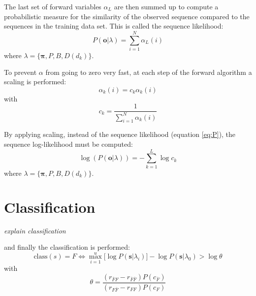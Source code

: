 \documentclass[mscthesis]{usiinfthesis}
\begin{document}
The last set of forward variables $ \alpha_L $ are then summed up to compute
a probabilistic measure for the similarity of the observed sequence compared to
the sequences in the training data set. This is called the sequence likelihood:
\begin{equation}
    \label{eq:P}
    P(\boldsymbol{o}|\lambda) = \sum\limits_{i=1}^{N} \alpha_L(i)
\end{equation}
where $ \lambda = \{\boldsymbol{\pi}, P, B, D(d_k) \} $.

To prevent $ \alpha $ from going to zero very fast, at each step of the forward
algorithm a scaling is performed:
\begin{equation}
    \label{eq:scaled}
    \alpha_k(i) = c_k \alpha_k(i)
\end{equation}
with
\begin{equation}
    \label{eq:scaling_factor}
    c_k = \frac{1}{\sum\limits_{i=1}^{N} \alpha_k(i)}
\end{equation}

By applying scaling, instead of the sequence likelihood (equation \ref{eq:P}),
the sequence log-likelihood must be computed:
\begin{equation}
    \label{eq:Plog}
    \log(P(\boldsymbol{o}|\lambda)) = -\sum\limits_{k=1}^{L} \log c_k
\end{equation}
where $ \lambda = \{\boldsymbol{\pi}, P, B, D(d_k) \} $.

\section{Classification}
\label{ch:event_class}

\emph{\color{red}explain classification}

and finally the
classification is performed:
\begin{equation}
    \label{eq:class}
    \text{class}(s) = F \iff \max_{i=1}^{u} \big [
        \log P(\boldsymbol{s}|\lambda_i)
    \big ] - \log P(\boldsymbol{s}|\lambda_0) > \log \theta
\end{equation}
with
\begin{equation}
    \label{eq:class_thresh}
    \theta = \frac{(r_{\bar{F}F} - r_{\bar{F}\bar{F}})P(c_{\bar{F}})}
        {(r_{F \bar{F}} - r_{FF})P(c_{F})}
\end{equation}
\end{document}
